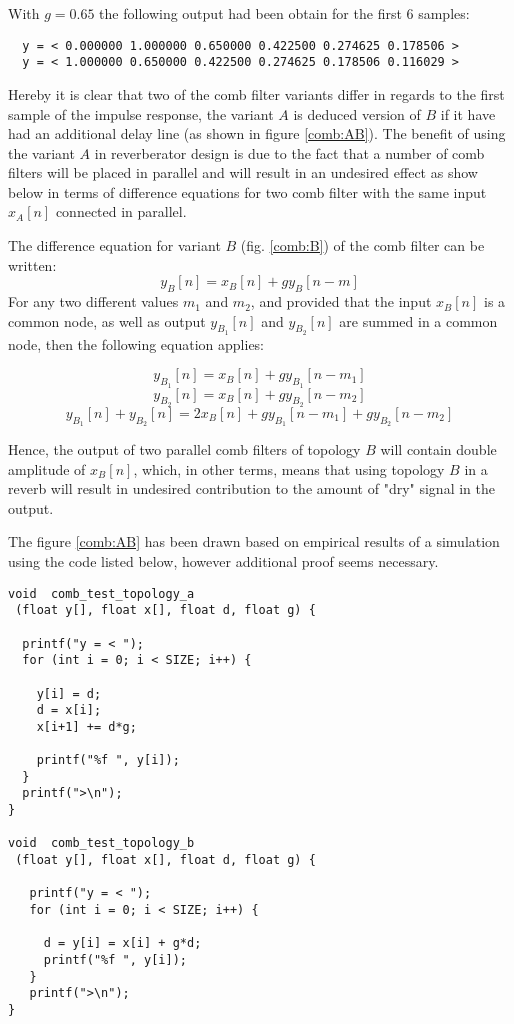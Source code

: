 \documentclass[12pt]{report}
\begin{document}
  With $g=0.65$ the following output had been obtain for the first 6 samples:
  \begin{verbatim}
  y = < 0.000000 1.000000 0.650000 0.422500 0.274625 0.178506 >
  y = < 1.000000 0.650000 0.422500 0.274625 0.178506 0.116029 >
  \end{verbatim}
  Hereby it is clear that two of the comb filter variants differ in regards to
  the first sample of the impulse response, the variant $A$ is deduced version of
  $B$ if it have had an additional delay line (as shown in figure \ref{comb:AB}).
  The benefit of using the variant $A$ in reverberator design is due to the fact
  that a number of comb filters will be placed in parallel and will result in an
  undesired effect as show below in terms of difference equations for two comb
  filter with the same input $x_A[n]$ connected in parallel.

  The difference equation for variant $B$ (fig. \ref{comb:B}) of the comb filter
  can be written:\begin{equation}
    y_B[n] = x_B[n] + gy_B[n-m]
  \end{equation}
  For any two different values $m_1$ and $m_2$, and provided that the input
  $x_B[n]$ is a common node, as well as output $y_{B_1}[n]$ and $y_{B_2}[n]$
  are summed in a common node, then the following equation applies:

  \[ y_{B_1}[n] = x_B[n] + gy_{B_1}[n-m_1] \]
  \[ y_{B_2}[n] = x_B[n] + gy_{B_2}[n-m_2] \]
  \[ y_{B_1}[n] + y_{B_2}[n] = 2x_{B}[n] + gy_{B_1}[n-m_1] + gy_{B_2}[n-m_2] \]

  Hence, the output of two parallel comb filters of topology $B$ will contain
  double amplitude of $x_B[n]$, which, in other terms, means that using topology
  $B$ in a reverb will result in undesired contribution to the amount of "dry"
  signal in the output.

  The figure \ref{comb:AB} has been drawn based on empirical results of a
  simulation using the code listed below, however additional proof seems
  necessary.

  \vspace{2em}

\begin{lstlisting}
void  comb_test_topology_a
 (float y[], float x[], float d, float g) {

  printf("y = < ");
  for (int i = 0; i < SIZE; i++) {
  
    y[i] = d;
    d = x[i];
    x[i+1] += d*g;
  
    printf("%f ", y[i]);
  }
  printf(">\n");
}

void  comb_test_topology_b
 (float y[], float x[], float d, float g) {

   printf("y = < ");
   for (int i = 0; i < SIZE; i++) {

     d = y[i] = x[i] + g*d;
     printf("%f ", y[i]);
   }
   printf(">\n");
}
\end{lstlisting}
\end{document}
